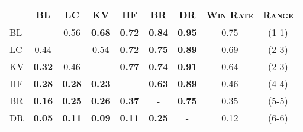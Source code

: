 \begin{tabular}{l|cccccc|cc} 
\hline
\textsc{} & \textsc{BL}& \textsc{LC} &  \textsc{KV} &  \textsc{HF} & \textsc{BR}  & \textsc{DR} &\textsc{Win Rate} & \textsc{Range}\\
\hline 
\textsc{BL}& - & 0.56 & \textbf{0.68} & \textbf{0.72} & \textbf{0.84} & \textbf{0.95}&  0.75 & (1-1) \\
\textsc{LC}& 0.44 & - & 0.54 & \textbf{0.72} & \textbf{0.75} & \textbf{0.89} & 0.69  & (2-3)\\
\textsc{KV}& \textbf{0.32} & 0.46 & - & \textbf{0.77} & \textbf{0.74} & \textbf{0.91} & 0.64 & (2-3)\\
\textsc{HF}& \textbf{0.28} & \textbf{0.28} & \textbf{0.23} & - & \textbf{0.63}& \textbf{0.89} & 0.46& (4-4)\\
\textsc{BR}& \textbf{0.16} & \textbf{0.25} & \textbf{0.26} & \textbf{0.37} & - & \textbf{0.75} & 0.35& (5-5) \\
\textsc{DR}& \textbf{0.05} & \textbf{0.11} & \textbf{0.09} & \textbf{0.11}& \textbf{0.25} & - & 0.12& (6-6) \\
\end{tabular}